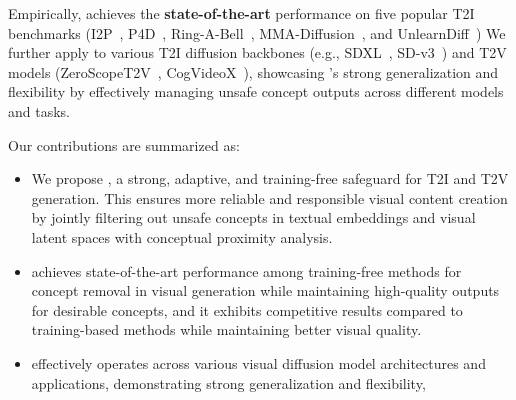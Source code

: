 Empirically, \ours{} achieves the \textbf{state-of-the-art} performance on five popular T2I benchmarks (I2P~\citep{schramowski2023safe}, P4D~\citep{chin2024prompting4debugging}, Ring-A-Bell~\citep{tsai2024ring}, MMA-Diffusion~\citep{yang2024mma}, and UnlearnDiff~\cite{zhang2023generate})
We further apply \ours{} to various T2I diffusion backbones (e.g., SDXL~\citep{podell2023sdxl}, SD-v3~\citep{2024sdv3}) and T2V models (ZeroScopeT2V~\citep{2023zeroscope}, CogVideoX~\citep{yang2024cogvideox}), showcasing \ours{}'s strong generalization and flexibility by effectively managing unsafe concept outputs across different models and tasks.

Our contributions are summarized as:
\begin{itemize}[leftmargin=0.15in]
    \item We propose \ours{}, a strong, adaptive, and training-free safeguard for T2I and T2V generation. This ensures more reliable and responsible visual content creation by jointly filtering out unsafe concepts in textual embeddings and visual latent spaces with conceptual proximity analysis.
    
    \item \ours{} achieves state-of-the-art performance among training-free methods for concept removal in visual generation while maintaining high-quality outputs for desirable concepts, and it exhibits competitive results compared to training-based methods while maintaining better visual quality.
    
    \item \ours{} effectively operates across various visual diffusion model architectures and applications, demonstrating strong generalization and flexibility, 
    
\end{itemize}
